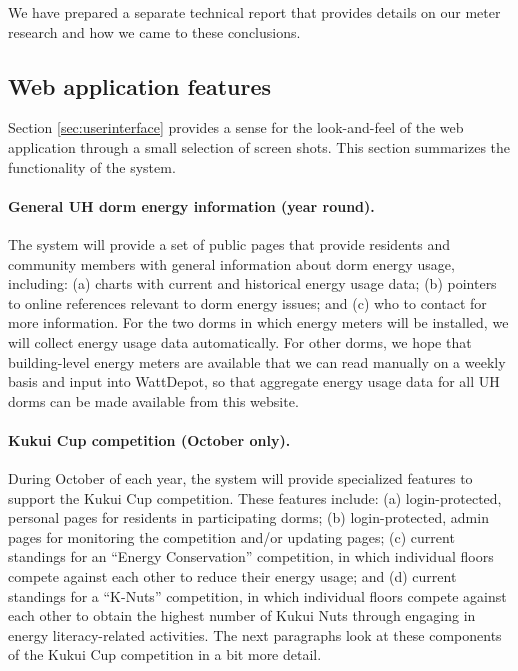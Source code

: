 \documentclass[11pt]{article}
\begin{document}
We have prepared a separate technical report \cite{Lim10} that provides details on our meter research and how we came to these conclusions. 

\subsection{Web application features}
\label{sec:features}

Section \ref{sec:userinterface} provides a sense for the look-and-feel of
the web application through a small selection of screen shots.  This section
summarizes the functionality of the system.

\paragraph{General UH dorm energy information (year round).}  The system
will provide a set of public pages that provide residents and community
members with general information about dorm energy usage, including: (a)
charts with current and historical energy usage data; (b) pointers to
online references relevant to dorm energy issues; and (c) who to contact
for more information.  For the two dorms in which energy meters will be
installed, we will collect energy usage data automatically.  For other
dorms, we hope that building-level energy meters are available that we can
read manually on a weekly basis and input into WattDepot, so that aggregate
energy usage data for all UH dorms can be made available from this website.

\paragraph{Kukui Cup competition (October only).}  During October of each
year, the system will provide specialized features to support the Kukui Cup
competition.  These features include: (a) login-protected, personal pages
for residents in participating dorms; (b) login-protected, admin pages for
monitoring the competition and/or updating pages; (c) current standings for
an ``Energy Conservation'' competition, in which individual floors compete
against each other to reduce their energy usage; and (d) current standings
for a ``K-Nuts'' competition, in which individual floors compete against
each other to obtain the highest number of Kukui Nuts through engaging in
energy literacy-related activities.  The next paragraphs look at these
components of the Kukui Cup competition in a bit more detail.
 
\end{document}
